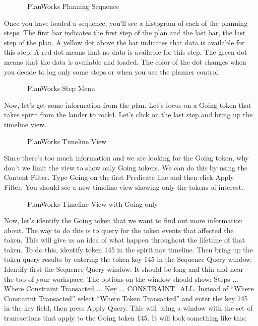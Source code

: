 \documentclass[10pt, letterpaper, twoside]{article}
\begin{document}
\begin{figure}[h]
\centering{}
\caption{\ET\, PlanWorks Planning Sequence}
\label{PlanningSequence}
\end{figure}

Once you have loaded a sequence, you'll see a histogram of each of the
planning steps.  The first bar indicates the first step of the plan and
the last bar, the last step of the plan.  A yellow dot above the bar
indicates that data is available for this step.  A red dot means that no
data is available for this step.  The green dot means that the data is
available and loaded.  The color of the dot changes when you decide to log
only some steps or when you use the planner control.

\begin{figure}[h]
\centering{}
\caption{\ET\, PlanWorks Step Menu}
\label{StepMenu}
\end{figure}

Now, let's get some information from the plan.  Let's focus on a Going
token that takes spirit from the lander to rock4.  Let's click on the last
step and bring up the timeline view.


\begin{figure}[h]
\centering{}
\caption{\ET\, PlanWorks Timeline View}
\label{TimelineView}
\end{figure}

Since there's too much information and we are looking for the Going token,
why don't we limit the view to show only Going tokens.  We can do this by
using the Content Filter.  Type Going on the first Predicate line and then
click Apply Filter.  You should see a new timeline view showing only the
tokens of interest.

\begin{figure}[h]
\centering{}
\caption{\ET\, PlanWorks Timeline View with Going only}
\label{TimelineViewFiltered}
\end{figure}

Now, let's identify the Going token that we want to find out more
information about.  The way to do this is to query for the token events
that affected the token.  This will give us an idea of what happen
throughout the lifetime of that token.  To do this, identify token 145 in
the spirit.nav timeline.  Then bring up the token query results by entering
the token key 145 in the Sequence Query window.  Identify first the Sequence
Query window.  It should be long and thin and near the top of your
workspace.  The options on the window should show: Steps ... Where
Constraint Transacted ... Key ... CONSTRAINT\_ALL. Instead of ``Where
Constarint Transacted'' select ``Where Token Transacted'' and enter the key
145 in the key field, then press Apply Query.  This will bring a window
with the set of transactions that apply to the Going token 145.  It will
look something like this:
\end{document}
